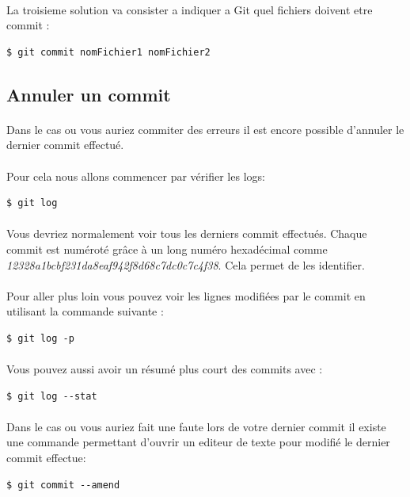\documentclass[french, a4paper, 12pt, titlepage]{article}
\begin{document}
\paragraph{}La troisieme solution va consister a indiquer a Git quel fichiers doivent etre commit :
\begin{lstlisting}
$ git commit nomFichier1 nomFichier2
\end{lstlisting}

\subsection{Annuler un commit}
\paragraph{}Dans le cas ou vous auriez commiter des erreurs il est encore possible d'annuler le dernier commit effectué.
\paragraph{}Pour cela nous allons commencer par vérifier les logs:
\begin{lstlisting}
$ git log
\end{lstlisting}

\paragraph{}Vous devriez normalement voir tous les derniers commit effectués. Chaque commit est numéroté grâce à un long numéro hexadécimal comme \textit{12328a1bcbf231da8eaf942f8d68c7dc0c7c4f38}. 
Cela permet de les identifier.

\paragraph{}Pour aller plus loin vous pouvez voir les lignes modifiées par le commit en utilisant la commande suivante :
\begin{lstlisting}
$ git log -p
\end{lstlisting}
\paragraph{}Vous pouvez aussi avoir un résumé plus court des commits avec :
\begin{lstlisting}
$ git log --stat
\end{lstlisting}

\paragraph{}Dans le cas ou vous auriez fait une faute lors de votre dernier commit il existe une commande permettant d'ouvrir un editeur de texte pour modifié le dernier commit effectue:
\begin{lstlisting}
$ git commit --amend
\end{lstlisting}
\end{document}
